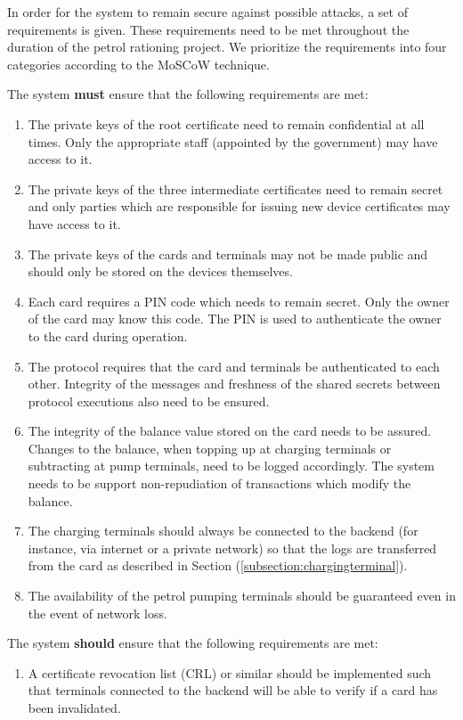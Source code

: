 In order for the system to remain secure against possible attacks, a set of requirements is given. These requirements need to be met throughout the duration of the petrol rationing project. We prioritize the requirements into four categories according to the MoSCoW technique.

The system {\bf must} ensure that the following requirements are met:
\begin{enumerate}
  \item The private keys of the root certificate need to remain confidential at all times. Only the appropriate staff (appointed by the government) may have access to it. 
  \item The private keys of the three intermediate certificates need to remain secret and only parties which are responsible for issuing new device certificates may have access to it.
  \item The private keys of the cards and terminals may not be made public and should only be stored on the devices themselves.
  \item Each card requires a PIN code which needs to remain secret. Only the owner of the card may know this code. The PIN is used to authenticate the owner to the card during operation.
  \item The protocol requires that the card and terminals be authenticated to each other. Integrity of the messages and freshness of the shared secrets between protocol executions also need to be ensured.
  \item The integrity of the balance value stored on the card needs to be assured. Changes to the balance, when topping up at charging terminals or subtracting at pump terminals, need to be logged accordingly. The system needs to be support non-repudiation of transactions which modify the balance.
  \item The charging terminals should always be connected to the backend (for instance, via internet or a private network) so that the logs are transferred from the card as described in Section (\ref{subsection:chargingterminal}).
  \item The availability of the petrol pumping terminals should be guaranteed even in the event of network loss. 
  
\end{enumerate}

The system {\bf should} ensure that the following requirements are met:
\begin{enumerate}
  \item A certificate revocation list (CRL) or similar should be implemented such that terminals connected to the backend will be able to verify if a card has been invalidated.
\end{enumerate}

